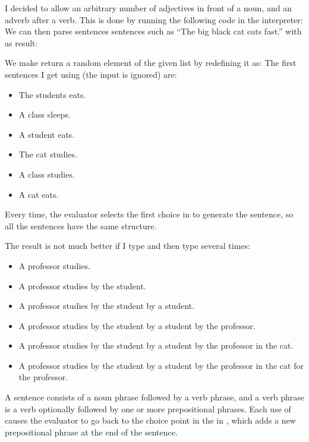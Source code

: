 \begin{exe}[4.48]
    \label{4.48}
    I decided to allow an arbitrary number of adjectives in front of a noun, and 
    an adverb after a verb. This is done by running the following code in the 
    interpreter:
    We can then parse sentences sentences such as “The big black cat eats fast.” 
    with as result:
\end{exe}

\begin{exe}[4.49]
    We make  return a random element of the given list by 
    redefining it as:
    The first sentences I get using  (the input is ignored) 
    are:
    \begin{itemize}
        \item The students eats.
        \item A class sleeps.
        \item A student eats.
        \item The cat studies.
        \item A class studies.
        \item A cat eats.
    \end{itemize}
    Every time, the evaluator selects the first choice in  to generate 
    the sentence, so all the sentences have the same structure.

    The result is not much better if I type  and then type 
     several times:
    \begin{itemize}
        \item A professor studies.
        \item A professor studies by the student.
        \item A professor studies by the student by a student.
        \item A professor studies by the student by a student by the professor.
        \item A professor studies by the student by a student by the professor 
            in the cat.
        \item A professor studies by the student by a student by the professor 
            in the cat for the professor.
    \end{itemize}
    A sentence consists of a noun phrase followed by a verb phrase, and a verb 
    phrase is a verb optionally followed by one or more prepositional phrases. 
    Each use of  causes the evaluator to go back to the choice 
    point in the  in , which adds a new 
    prepositional phrase at the end of the sentence.
\end{exe}

